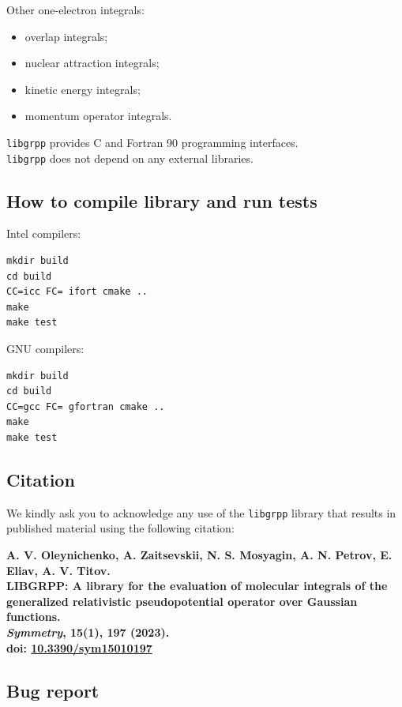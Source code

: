 \documentclass[12pt]{article}
\begin{document}
\noindent
Other one-electron integrals:

\begin{itemize}
\item overlap integrals;
\item nuclear attraction integrals;
\item kinetic energy integrals;
\item momentum operator integrals.
\end{itemize}

\noindent
\texttt{libgrpp} provides C and Fortran 90 programming interfaces. \\
\texttt{libgrpp} does not depend on any external libraries.

\subsection{How to compile library and run tests}

Intel compilers:

\begin{lstlisting}
mkdir build
cd build
CC=icc FC= ifort cmake ..
make
make test
\end{lstlisting}

\noindent
GNU compilers:

\begin{lstlisting}
mkdir build
cd build
CC=gcc FC= gfortran cmake ..
make
make test
\end{lstlisting}


\subsection{Citation}

We kindly ask you to acknowledge any use of the \texttt{libgrpp} library that results in published material using the following citation:

\bigskip

\noindent
\textbf{A. V. Oleynichenko, A. Zaitsevskii, N. S. Mosyagin, A. N. Petrov, E. Eliav, A. V. Titov. \\
LIBGRPP: A library for the evaluation of molecular integrals of the generalized relativistic pseudopotential operator over Gaussian functions. \\
\textit{Symmetry}, 15(1), 197 (2023). \\
doi: \href{https://dx.doi.org/10.3390/sym15010197}{10.3390/sym15010197}
}


\subsection{Bug report}
\end{document}
